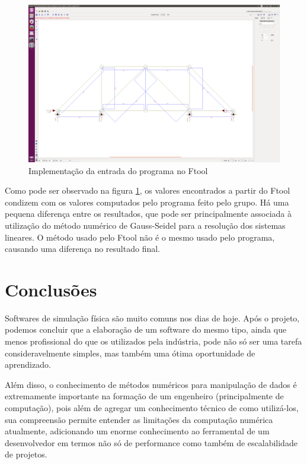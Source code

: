 \documentclass[paper=a4, fontsize=11pt]{scrartcl}
\begin{document}
\begin{figure}[H]
  \includegraphics[width=\textwidth]{ftool.png}
  \caption{Implementação da entrada do programa no Ftool}
  \label{fig:ftool}
\end{figure}

Como pode ser observado na figura \ref{fig:ftool}, os valores encontrados a partir do Ftool condizem com os valores computados pelo programa feito pelo grupo. Há uma pequena diferença entre os resultados, que pode ser principalmente associada à utilização do método numérico de Gauss-Seidel para a resolução dos sistemas lineares. O método usado pelo Ftool não é o mesmo usado pelo programa, causando uma diferença no resultado final.

\section{Conclusões}

Softwares de simulação física são muito comuns nos dias de hoje. Após o projeto, podemos concluir que a elaboração de um software do mesmo tipo, ainda que menos profissional do que os utilizados pela indústria, pode não só ser uma tarefa consideravelmente simples, mas também uma ótima oportunidade de aprendizado.

Além disso, o conhecimento de métodos numéricos para manipulação de dados é extremamente importante na formação de um engenheiro (principalmente de computação), pois além de agregar um conhecimento técnico de como utilizá-los, sua compreensão permite entender as limitações da computação numérica atualmente, adicionando um enorme conhecimento ao ferramental de um desenvolvedor em termos não só de performance como também de escalabilidade de projetos.
\end{document}
